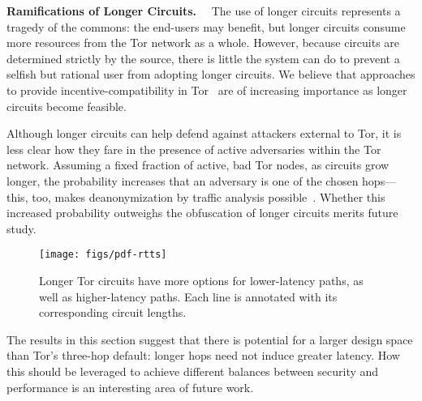
\medskip

\noindent
%
\textbf{Ramifications of Longer Circuits.}~~
%
The use of longer circuits represents a tragedy of the commons: the
end-users may benefit, but longer circuits consume more resources from
the Tor network as a whole.
%
However, because circuits are determined strictly by the source, there
is little the system can do to prevent a selfish but rational user from
adopting longer circuits.
%
We believe that approaches to provide incentive-compatibility in
Tor~\cite{tor-incentives,par,xpay} are of increasing importance as
longer circuits become feasible. 



Although longer circuits can help defend against attackers external to
Tor, it is less clear how they fare in the presence of active
adversaries within the Tor network.
%
Assuming a fixed fraction of active, bad Tor nodes, as circuits grow
longer, the probability increases that an adversary is one of the
chosen hops---this, too, makes deanonymization by traffic analysis
possible~\cite{get-routed}.
%
Whether this increased probability outweighs the obfuscation of longer
circuits merits future study.

\begin{figure}[t!]
\centering

\texttt{[image: figs/pdf-rtts]}
\caption{\label{fig:pdf-rtts} Longer Tor circuits have more options for
lower-latency paths, as well as higher-latency paths. Each line is
annotated with its corresponding circuit lengths.}

\end{figure}




\medskip

\noindent
%
The results in this section suggest that there is potential for a
larger design space than Tor's three-hop default: longer hops need not
induce greater latency. 
%
How this should be leveraged to achieve different balances between
security and performance is an interesting area of future work.




